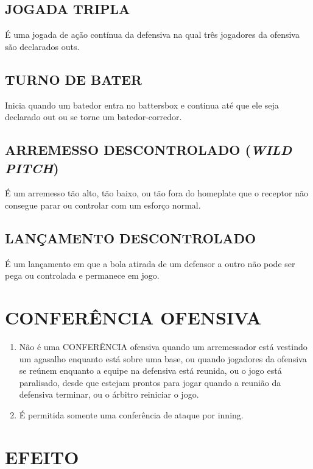 \subsection{JOGADA TRIPLA}
 É uma jogada de ação contínua da defensiva na qual três jogadores da ofensiva são declarados \gls{out}s.

\subsection{TURNO DE BATER}
 Inicia quando um batedor entra no \gls{battersbox} e continua até que ele seja declarado \gls{out} ou se torne um batedor-corredor.

\subsection{ARREMESSO DESCONTROLADO (\textit{WILD PITCH})}

 É um arremesso tão alto, tão baixo, ou tão fora do \gls{homeplate} que o receptor não consegue parar ou controlar com um esforço normal.

\subsection{LANÇAMENTO DESCONTROLADO}

É um lançamento em que a bola atirada de um defensor a outro não pode ser pega ou controlada e permanece em jogo.

\section{CONFERÊNCIA OFENSIVA}

\begin{enumerate}[label=(\alph*)]
	\item   Não é uma CONFERÊNCIA ofensiva quando um arremessador está vestindo um agasalho enquanto está sobre uma base, ou quando jogadores da ofensiva  se reúnem enquanto a equipe na defensiva está reunida, ou o jogo está paralisado, desde que estejam prontos para jogar quando a reunião da defensiva terminar, ou o árbitro reiniciar o jogo.
	\item  É permitida somente uma conferência de ataque por \gls{inning}.
\end{enumerate}
\section*{EFEITO}

